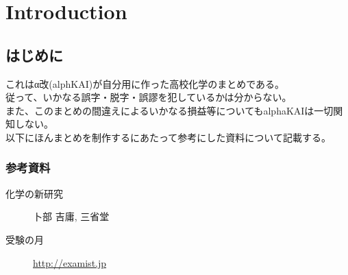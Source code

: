 \part{Introduction}
\chapter{はじめに}
これはα改(alphKAI)が自分用に作った高校化学のまとめである。 \\
従って、いかなる誤字・脱字・誤謬を犯しているかは分からない。 \\
また、このまとめの間違えによるいかなる損益等についてもalphaKAIは一切関知しない。 \\
以下にほんまとめを制作するにあたって参考にした資料について記載する。

\section{参考資料}{
	\begin{description}
		\item[化学の新研究] 卜部 吉庸, 三省堂
		\item[受験の月] \url{http://examist.jp}
	\end{description}
}


